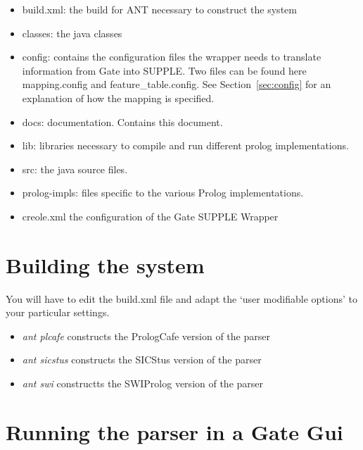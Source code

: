 \documentclass[a4paper,titlepage,openany,twoside]{book}
\begin{document}
\begin{itemize}

\item build.xml: the  build for ANT necessary to construct the system

\item classes: the java classes

\item config: contains the configuration files the wrapper needs to
translate information from Gate into SUPPLE. Two files can be found here
mapping.config and feature\_table.config. See
Section~\ref{sec:config} for an explanation of how the mapping is specified. 


\item docs: documentation. Contains this document.

\item lib: libraries necessary to compile and run different prolog
implementations.

\item src: the java source files.

\item prolog-impls: files specific to the various Prolog implementations.

\item creole.xml the configuration of the Gate SUPPLE Wrapper

\end{itemize}

\chapter{Building the system}

You will have to edit the build.xml file and adapt the `user
modifiable options' to your particular settings.

\begin{itemize}

\item {\em ant plcafe} constructs the PrologCafe version of the parser

\item {\em ant sicstus} constructs the SICStus version of the parser

\item {\em ant swi} constructts the SWIProlog version of the parser

\end{itemize}

\chapter{Running the parser in a Gate Gui}
\end{document}

